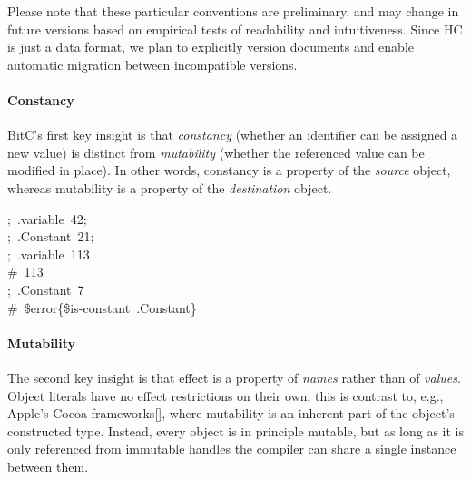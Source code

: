 \documentclass[preprint]{{sigplanconf}}
\begin{document}
\noindent{}Please note that these particular conventions are preliminary, and may
change in future versions based on empirical tests of readability and
intuitiveness. Since HC is just a data format, we plan to explicitly
version documents and enable automatic migration between incompatible versions.%

\paragraph{Constancy}\label{sec-constancy}%

\noindent{}BitC's first key insight is that \emph{constancy} (whether an identifier can be
assigned a new value) is distinct from \emph{mutability} (whether the
referenced value can be modified in place). In other words, constancy is
a property of the \emph{source} object, whereas mutability is a property of the
\emph{destination} object.%
\begin{mdpre}%
\noindent;~.variable~{42};\\
;~.{Constant}~{21};\\
;~.variable~{113}\\
{\#~113}\\
;~.{Constant}~7\\
{\#~\$error\{\$is-constant~.Constant\}}%
\end{mdpre}
\paragraph{Mutability}\label{sec-mutability}%

\noindent{}The second key insight is that effect is a property of
\emph{names} rather than of \emph{values}. Object literals have no effect
restrictions on their own; this is contrast to, e.g., Apple's Cocoa
frameworks[], where mutability is an inherent part of the object's
constructed type. Instead, every object is in principle mutable, but as
long as it is only referenced from immutable handles the compiler can
share a single instance between them.%
\end{document}
